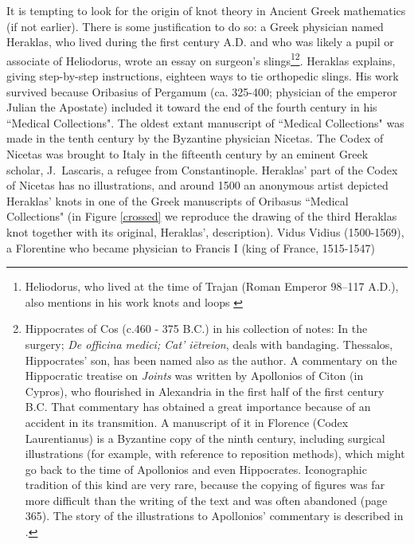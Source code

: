 \documentclass[12pt]{amsart}
\begin{document}
 It is tempting to look for the origin of knot theory in Ancient
Greek mathematics (if not earlier). There is some justification to do so:
a Greek physician named Heraklas, who lived during the first century A.D.
and who was likely a pupil or associate of Heliodorus, wrote an essay
on surgeon's slings\footnote{Heliodorus, who lived at the time
of Trajan (Roman Emperor 98--117 A.D.), also mentions in
his work knots and loops \cite{Sar1}}\footnote{Hippocrates of
Cos (c.460 - 375 B.C.) in his collection of notes:
In the surgery; {\it De officina medici; Cat' i\={e}treion}, deals with
bandaging. Thessalos, Hippocrates' son, has been named also as the author.
 A commentary on the Hippocratic treatise on {\it Joints} was written by
 Apollonios of Citon (in Cypros), who flourished in Alexandria in the
first half of the first century B.C. That commentary has obtained a
great importance because of an accident in its transmition. A manuscript
 of it in Florence (Codex Laurentianus) is a Byzantine copy of the ninth
century, including surgical illustrations (for example, with reference to
 reposition methods), which might go back to the time of Apollonios and
even Hippocrates. Iconographic tradition of this kind are very rare,
because the copying of figures was far more difficult than the writing
of the text and was often abandoned \cite{Sar1} (page 365).
The story of the illustrations to Apollonios' commentary is described in
\cite{Sar2}.}.
Heraklas explains,  giving step-by-step instructions,
eighteen ways to tie orthopedic slings. His work survived because
Oribasius of Pergamum (ca. 325-400; physician of the emperor
 Julian the Apostate) included it toward the end of the fourth century
in his ``Medical Collections". The oldest extant manuscript of ``Medical
Collections" was made in the tenth century by the Byzantine physician
Nicetas. The Codex of Nicetas was brought to Italy in the fifteenth century by
an eminent Greek scholar,   J.~Lascaris,  a refugee from Constantinople.
Heraklas' part of the Codex of Nicetas has no illustrations,
and around 1500 an anonymous artist depicted Heraklas' knots in one of
the Greek manuscripts of Oribasus ``Medical Collections" (in Figure \ref{crossed} we
reproduce the drawing of the third Heraklas knot together with its
original,   Heraklas',  description). Vidus Vidius (1500-1569),
a Florentine who became physician to Francis I (king of France, 1515-1547)
\end{document}
